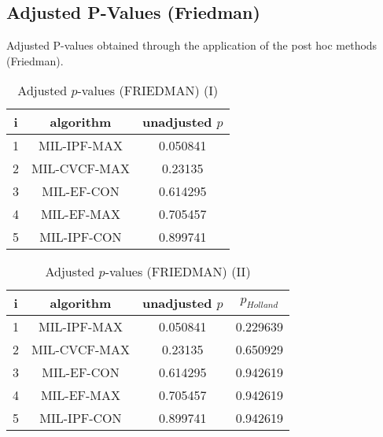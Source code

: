 \documentclass[a4paper,10pt]{article}
\begin{document}
\begin{landscape}
\newpage

\section{Adjusted P-Values (Friedman)}


Adjusted P-values obtained through the application of the post hoc methods (Friedman).

\begin{table}[!htp]
\centering\small
\begin{tabular}{ccc}
i&algorithm&unadjusted $p$\\
\hline1&MIL-IPF-MAX&0.050841\\2&MIL-CVCF-MAX&0.23135\\3&MIL-EF-CON&0.614295\\4&MIL-EF-MAX&0.705457\\5&MIL-IPF-CON&0.899741\\\hline
\end{tabular}
\caption{Adjusted $p$-values (FRIEDMAN) (I)}
\end{table}
\begin{table}[!htp]
\centering\small
\begin{tabular}{cccc}
i&algorithm&unadjusted $p$&$p_{Holland}$\\
\hline1&MIL-IPF-MAX&0.050841&0.229639\\2&MIL-CVCF-MAX&0.23135&0.650929\\3&MIL-EF-CON&0.614295&0.942619\\4&MIL-EF-MAX&0.705457&0.942619\\5&MIL-IPF-CON&0.899741&0.942619\\\hline
\end{tabular}
\caption{Adjusted $p$-values (FRIEDMAN) (II)}
\end{table}

\newpage
\end{landscape}
\end{document}

